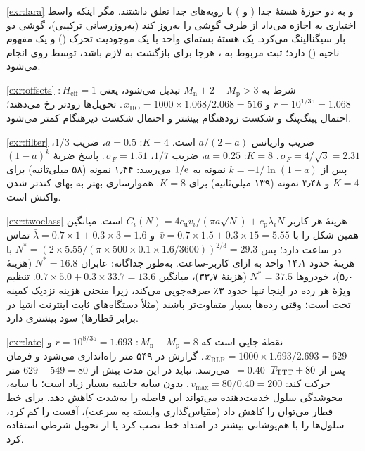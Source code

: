 \documentclass[11pt,a4paper]{article}
\begin{document}
\begin{solutionbox}{\ref{exr:lara}}
 و  به دو حوزهٔ هستهٔ جدا ( و ) با رویه‌های جدا تعلق داشتند.
مگر اینکه واسط اختیاری  به  اجازه می‌داد از طرف گوشی  را به‌روز کند
(به‌روزرسانی ترکیبی)، گوشی دو بار سیگنالینگ می‌کرد.  یک هستهٔ بسته‌ای واحد با یک موجودیت
تحرک () و یک مفهوم ناحیه () دارد؛ ثبت مربوط به ، هرجا برای بازگشت به 
لازم باشد، توسط  روی  انجام می‌شود.
\end{solutionbox}

\begin{solutionbox}{\ref{exr:offsets}}
شرط به $M_\mathrm{n} + 2 - M_\mathrm{p} > 3$ تبدیل می‌شود، یعنی $H_{\mathrm{eff}} = 1$\,:
$r = 10^{1/35} = 1.068$ و $x_{\mathrm{HO}} = 1000\times1.068/2.068 = 516$\,. تحویل‌ها زودتر رخ می‌دهند؛
احتمال پینگ‌پنگ و شکست زودهنگام بیشتر و احتمال شکست دیرهنگام کمتر می‌شود.
\end{solutionbox}

\begin{solutionbox}{\ref{exr:filter}}
ضریب واریانس $a/(2-a)$ است. $K=4$: $a=0.5$، ضریب $1/3$، $\sigma_F = 4/\sqrt3 = 2.31$\,.
$K=8$: $a = 0.25$، ضریب $1/7$، $\sigma_F = 1.51$\,. پاسخ ضربهٔ $(1-a)^k$ پس از
$k = -1/\ln(1-a)$ نمونه به $1/\mathrm{e}$ می‌رسد: ۱٫۴۴ نمونه (۵۸ میلی‌ثانیه) برای $K=4$ و ۳٫۴۸ نمونه (۱۳۹
میلی‌ثانیه) برای $K=8$. هموارسازی بهتر به بهای کندتر شدن واکنش است.
\end{solutionbox}

\begin{solutionbox}{\ref{exr:twoclass}}
هزینهٔ هر کاربر $C_i(N) = 4c_\mathrm{u}v_i/(\pi a\sqrt N) + c_\mathrm{p}\lambda_iN$ است. میانگین همین شکل را با
$\bar v = 0.7\times1.5+0.3\times15 = 5.55$\, و $\bar\lambda = 0.7\times1+0.3\times3 = 1.6$ تماس در ساعت
دارد؛ پس $N^\ast = (2\times5.55/(\pi\times500\times0.1\times1.6/3600))^{2/3} = 29.3$ با هزینهٔ حدود
۱۴٫۱ واحد به ازای کاربر-ساعت. به‌طور جداگانه: عابران $N^\ast = 16.8$ (هزینهٔ ۵٫۰)، خودروها
$N^\ast = 37.5$ (هزینهٔ ۳۳٫۷)، میانگین $0.7\times5.0+0.3\times33.7 = 13.6$. تنظیم ویژهٔ هر رده در اینجا تنها
حدود ۳٪ صرفه‌جویی می‌کند، زیرا منحنی هزینه نزدیک کمینه تخت است؛ وقتی رده‌ها بسیار متفاوت‌تر باشند
(مثلاً دستگاه‌های ثابت اینترنت اشیا در برابر قطارها) سود بیشتری دارد.
\end{solutionbox}

\begin{solutionbox}{\ref{exr:late}}
نقطهٔ  جایی است که $M_\mathrm{n}-M_\mathrm{p} = 8$\,: $r = 10^{8/35} = 1.693$ و
$x_{\mathrm{RLF}} = 1000\times1.693/2.693 = 629$\,. گزارش در ۵۴۹ متر راه‌اندازی می‌شود و فرمان پس از
$T_{\mathrm{TTT}} + 80$\, $= 0.40$\, می‌رسد.  نباید در این مدت بیش از $629-549 = 80$ متر حرکت کند:
$v_{\max} = 80/0.40 = 200$\,. بدون سایه حاشیه بسیار زیاد است؛ با سایه، محوشدگی سلول خدمت‌دهنده
می‌تواند این فاصله را به‌شدت کاهش دهد. برای خط قطار می‌توان  را کاهش داد (مقیاس‌گذاری وابسته به
سرعت)، آفست را کم کرد، سلول‌ها را با هم‌پوشانی بیشتر در امتداد خط نصب کرد یا از تحویل شرطی استفاده کرد.
\end{solutionbox}
\end{document}
